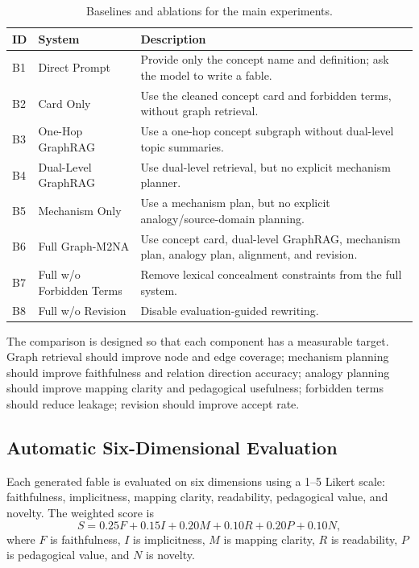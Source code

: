 \documentclass[letterpaper]{article} %
\begin{document}
\begin{table}[t]
\centering
\small
\begin{tabular}{lll}
\toprule
ID & System & Description \\
\midrule
B1 & Direct Prompt & Provide only the concept name and definition; ask the model to write a fable. \\
B2 & Card Only & Use the cleaned concept card and forbidden terms, without graph retrieval. \\
B3 & One-Hop GraphRAG & Use a one-hop concept subgraph without dual-level topic summaries. \\
B4 & Dual-Level GraphRAG & Use dual-level retrieval, but no explicit mechanism planner. \\
B5 & Mechanism Only & Use a mechanism plan, but no explicit analogy/source-domain planning. \\
B6 & Full Graph-M2NA & Use concept card, dual-level GraphRAG, mechanism plan, analogy plan, alignment, and revision. \\
B7 & Full w/o Forbidden Terms & Remove lexical concealment constraints from the full system. \\
B8 & Full w/o Revision & Disable evaluation-guided rewriting. \\
\bottomrule
\end{tabular}
\caption{Baselines and ablations for the main experiments.}
\label{tab:baselines}
\end{table}

The comparison is designed so that each component has a measurable target. Graph retrieval should improve node and edge coverage; mechanism planning should improve faithfulness and relation direction accuracy; analogy planning should improve mapping clarity and pedagogical usefulness; forbidden terms should reduce leakage; revision should improve accept rate.

\subsection{Automatic Six-Dimensional Evaluation}

Each generated fable is evaluated on six dimensions using a 1--5 Likert scale: faithfulness, implicitness, mapping clarity, readability, pedagogical value, and novelty. The weighted score is
\[
S = 0.25F + 0.15I + 0.20M + 0.10R + 0.20P + 0.10N,
\]
where $F$ is faithfulness, $I$ is implicitness, $M$ is mapping clarity, $R$ is readability, $P$ is pedagogical value, and $N$ is novelty.
\end{document}

